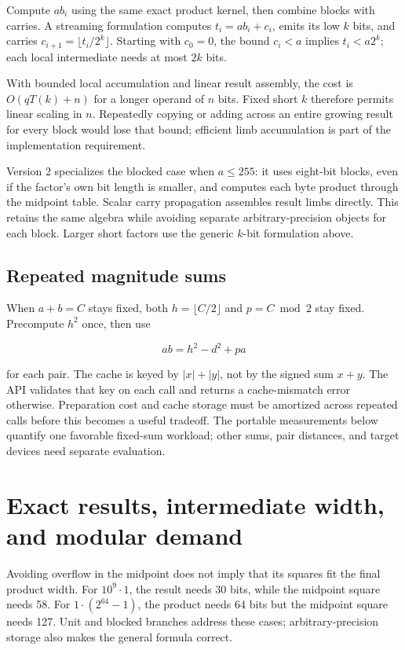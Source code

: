 \documentclass[11pt,a4paper]{article}
\begin{document}
Compute $ab_i$ using the same exact product kernel, then combine blocks with carries. A streaming formulation computes $t_i=ab_i+c_i$, emits its low $k$ bits, and carries $c_{i+1}=\lfloor t_i/2^k\rfloor$. Starting with $c_0=0$, the bound $c_i<a$ implies $t_i<a2^k$; each local intermediate needs at most $2k$ bits.

With bounded local accumulation and linear result assembly, the cost is $O(qT(k)+n)$ for a longer operand of $n$ bits. Fixed short $k$ therefore permits linear scaling in $n$. Repeatedly copying or adding across an entire growing result for every block would lose that bound; efficient limb accumulation is part of the implementation requirement.

Version 2 specializes the blocked case when $a\le255$: it uses eight-bit blocks, even if the factor's own bit length is smaller, and computes each byte product through the midpoint table. Scalar carry propagation assembles result limbs directly. This retains the same algebra while avoiding separate arbitrary-precision objects for each block. Larger short factors use the generic $k$-bit formulation above.

\subsection{Repeated magnitude sums}

When $a+b=C$ stays fixed, both $h=\lfloor C/2\rfloor$ and $p=C\bmod2$ stay fixed. Precompute $h^2$ once, then use

\[
ab=h^2-d^2+pa
\]

for each pair. The cache is keyed by $|x|+|y|$, not by the signed sum $x+y$. The API validates that key on each call and returns a cache-mismatch error otherwise. Preparation cost and cache storage must be amortized across repeated calls before this becomes a useful tradeoff. The portable measurements below quantify one favorable fixed-sum workload; other sums, pair distances, and target devices need separate evaluation.

\section{Exact results, intermediate width, and modular demand}

Avoiding overflow in the midpoint does not imply that its squares fit the final product width. For $10^9\cdot1$, the result needs 30 bits, while the midpoint square needs 58. For $1\cdot(2^{64}-1)$, the product needs 64 bits but the midpoint square needs 127. Unit and blocked branches address these cases; arbitrary-precision storage also makes the general formula correct.
\end{document}
